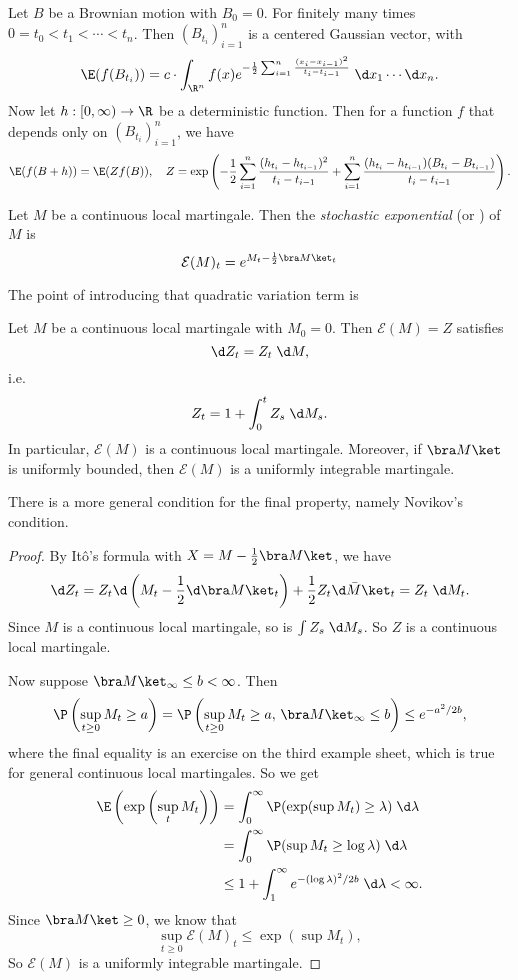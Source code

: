 \documentclass[a4paper]{article}
\begin{document}
\begin{eg}
  Let $B$ be a Brownian motion with $B_0 = 0$. For finitely many times $0 = t_0 < t_1 < \cdots < t_n$. Then $(B_{t_i})_{i = 1}^n$ is a centered Gaussian vector, with
  \[
    \E (f(B_{t_i})) = c \cdot \int_{\R^n} f(x) e^{-\frac{1}{2} \sum_{i = 1}^n \frac{(x_i - x_{i - 1})^2}{t_i - t_{i - 1}}}\;\d x_1 \cdots \d x_n.
  \]
  Now let $h: [0, \infty) \to \R$ be a deterministic function. Then for a function $f$ that depends only on $(B_{t_i})_{i = 1}^n$, we have
  \[
    \E (f (B + h)) = \E (Z f(B)),\quad Z = \exp \left(-\frac{1}{2} \sum_{i = 1}^n \frac{(h_{t_i} - h_{t_{i - 1}})^2}{t_i - t_{i - 1}} + \sum_{i = 1}^n \frac{(h_{t_i} - h_{t_{i - 1}})(B_{t_i} - B_{t_{i - 1}})}{t_i - t_{i - 1}}\right).
  \]
\end{eg}

\begin{defi}
  Let $M$ be a continuous local martingale. Then the \emph{stochastic exponential} (or ) of $M$ is
  \[
    \mathcal{E}(M)_t = e^{M_t - \frac{1}{2} \bra M\ket_t}
  \]
\end{defi}
The point of introducing that quadratic variation term is
\begin{prop}
  Let $M$ be a continuous local martingale with $M_0 = 0$. Then $\mathcal{E}(M) = Z$ satisfies
  \[
    \d Z_t = Z_t \;\d M,
  \]
  i.e.
  \[
    Z_t = 1 + \int_0^t Z_s \;\d M_s.
  \]
  In particular, $\mathcal{E}(M)$ is a continuous local martingale. Moreover, if $\bra M\ket$ is uniformly bounded, then $\mathcal{E}(M)$ is a uniformly integrable martingale.
\end{prop}
There is a more general condition for the final property, namely Novikov's condition.

\begin{proof}
  By It\^o's formula with $X = M - \frac{1}{2} \bra M\ket$, we have
  \[
    \d Z_t = Z_t \d \left(M_t - \frac{1}{2} \d \bra M\ket_t\right) + \frac{1}{2} Z_t \d \bar M\ket_t = Z_t \;\d M_t.
  \]
  Since $M$ is a continuous local martingale, so is $\int Z_s \;\d M_s$. So $Z$ is a continuous local martingale.

  Now suppose $\bra M\ket_\infty \leq b < \infty$. Then
  \[
    \P \left(\sup_{t \geq 0} M_t \geq a\right) = \P \left(\sup_{t \geq 0} M_t \geq a,\, \bra M\ket_\infty \leq b\right) \leq e^{-a^2/2b},
  \]
  where the final equality is an exercise on the third example sheet, which is true for general continuous local martingales. So we get
  \begin{align*}
    \E \left(\exp \left(\sup_t M_t\right)\right) &= \int_0^\infty \P(\exp (\sup M_t)\geq \lambda)\;\d \lambda \\
    &= \int_0^\infty \P (\sup M_t \geq \log \lambda)\;\d \lambda\\
    &\leq 1 + \int_1^\infty e^{-(\log \lambda)^2/2b} \;\d \lambda < \infty.
  \end{align*}
  Since $\bra M\ket \geq 0$, we know that
  \[
    \sup_{t \geq 0} \mathcal{E}(M)_t \leq \exp \left(\sup M_t\right),
  \]
  So $\mathcal{E}(M)$ is a uniformly integrable martingale.
\end{proof}
\end{document}
